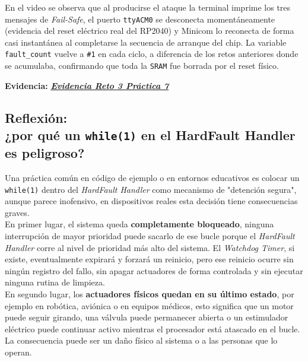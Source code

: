 \documentclass[12pt,letterpaper]{article}
\begin{document}
\bigskip

En el video se observa que al producirse el ataque la terminal imprime los tres mensajes de \textit{Fail-Safe},
el puerto \texttt{ttyACM0} se desconecta momentáneamente (evidencia del reset eléctrico real del RP2040) y
Minicom lo reconecta de forma casi instantánea al completarse la secuencia de arranque del chip.
La variable \texttt{fault\_count} vuelve a \texttt{\#1} en cada ciclo, a diferencia de los retos anteriores
donde se acumulaba, confirmando que toda la \texttt{SRAM} fue borrada por el reset físico.

\textbf{Evidencia:}
\href{https://drive.google.com/file/d/1Hh8ghAZ_HhTtK0zuvYGGHo4ie9aAXv0f/view?usp=sharing&t=199.448}
     {\textbf{\textit{\textcolor{linkblue}{Evidencia Reto 3 Práctica 7}}}}
     
\subsection*{Reflexión:\\ ¿por qué un \texttt{while(1)} en el HardFault Handler es peligroso?}
Una práctica común en código de ejemplo o en entornos educativos es colocar un \texttt{while(1)} dentro del
\textit{HardFault Handler} como mecanismo de "detención segura", aunque parece inofensivo, en dispositivos
reales esta decisión tiene consecuencias graves.\\
 
En primer lugar, el sistema queda \textbf{completamente bloqueado}, ninguna interrupción de mayor prioridad puede
sacarlo de ese bucle porque el \textit{HardFault Handler} corre al nivel de prioridad más alto del sistema.
El \textit{Watchdog Timer}, si existe, eventualmente expirará y forzará un reinicio, pero ese reinicio ocurre sin
ningún registro del fallo, sin apagar actuadores de forma controlada y sin ejecutar ninguna rutina de limpieza.\\
 
En segundo lugar, los \textbf{actuadores físicos quedan en su último estado}, por ejemplo en robótica, aviónica
o en equipos médicos, esto significa que un motor puede seguir girando, una válvula puede permanecer abierta o
un estimulador eléctrico puede continuar activo mientras el procesador está atascado en el bucle.
La consecuencia puede ser un daño físico al sistema o a las personas que lo operan.\\
 
\end{document}
